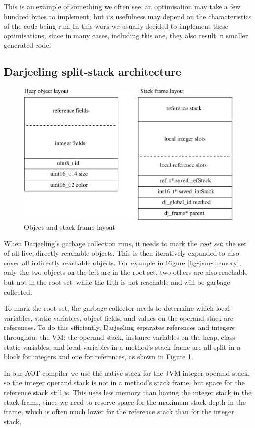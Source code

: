 This is an example of something we often see: an optimisation may take a few hundred bytes to implement, but its usefulness may depend on the characteristics of the code being run. In this work we usually decided to implement these optimisations, since in many cases, including this one, they also result in smaller generated code.

\subsection{Darjeeling split-stack architecture}
\label{sec-darjeeling-split-architecure}

\begin{figure}
\centering
\includegraphics[width=0.6\linewidth]{object-and-stack-frame-layout.eps}
\caption{Object and stack frame layout}
\label{fig-object-and-stack-frame-layout}
\end{figure}

When Darjeeling's garbage collection runs, it needs to mark the \emph{root set}: the set of all live, directly reachable objects. This is then iteratively expanded to also cover all indirectly reachable objects. For example in Figure \ref{fig-jvm-memory}, only the two objects on the left are in the root set, two others are also reachable but not in the root set, while the fifth is not reachable and will be garbage collected.

To mark the root set, the garbage collector needs to determine which local variables, static variables, object fields, and values on the operand stack are references. To do this efficiently, Darjeeling separates references and integers throughout the VM: the operand stack, instance variables on the heap, class static variables, and local variables in a method's stack frame are all split in a block for integers and one for references, as shown in Figure \ref{fig-object-and-stack-frame-layout}.

In our AOT compiler we use the native stack for the JVM integer operand stack, so the integer operand stack is not in a method's stack frame, but space for the reference stack still is. This uses less memory than having the integer stack in the stack frame, since we need to reserve space for the maximum stack depth in the frame, which is often much lower for the reference stack than for the integer stack.

